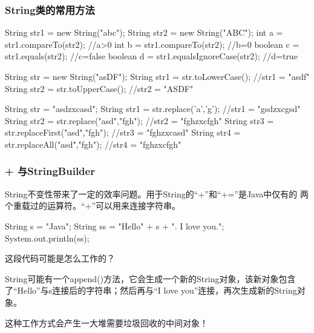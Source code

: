 \begin{frame}[fragile]
  \frametitle{String类的常用方法}


  \begin{javaCode}
    String str1 = new String("abc");
    String str2 = new String("ABC");
    int a = str1.compareTo(str2);  //a>0
    int b = str1.compareTo(str2);  //b=0
    boolean c = str1.equals(str2); //c=false
    boolean d = str1.equalsIgnoreCase(str2); //d=true
  \end{javaCode}


  \begin{javaCode}
    String str = new String("asDF");
    String str1 = str.toLowerCase(); //str1 = "asdf"
    String str2 = str.toUpperCase(); //str2 = "ASDF"
  \end{javaCode}


  \begin{javaCode}
    String str = "asdzxcasd";
    String str1 = str.replace('a','g'); //str1 = "gsdzxcgsd"
    String str2 = str.replace("asd","fgh"); //str2 = "fghzxcfgh"
    String str3 = str.replaceFirst("asd","fgh"); //str3 = "fghzxcasd"
    String str4 = str.replaceAll("asd","fgh"); //str4 = "fghzxcfgh"
  \end{javaCode}

\end{frame}

\begin{frame}[fragile]
  \frametitle{+ 与StringBuilder}

  String不变性带来了一定的效率问题。用于String的“+”和“+=”是Java中仅有的
  两个重载过的运算符。“+”可以用来连接字符串。

  \begin{javaCode}
    String s = "Java";
    String ss = "Hello" + s + ". I love you.";
    System.out.println(ss);
  \end{javaCode}

  这段代码可能是怎么工作的？\pause

  String可能有一个append()方法，它会生成一个新的String对象，该新对象包含了“Hello”与s连接后的字符串；然后再与“I love you”连接，再次生成新的String对象。\pause

  {\Red\kai 这种工作方式会产生一大堆需要垃圾回收的中间对象！}
\end{frame}

